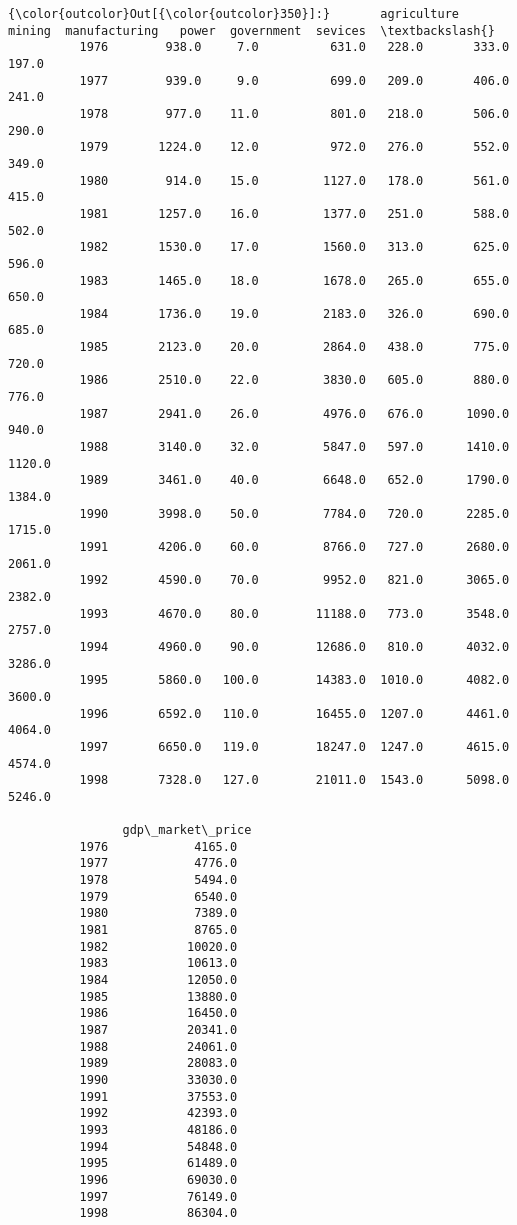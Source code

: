 \documentclass[11pt]{article}
\begin{document}
\begin{Verbatim}[commandchars=\\\{\}]
{\color{outcolor}Out[{\color{outcolor}350}]:}       agriculture  mining  manufacturing   power  government  sevices  \textbackslash{}
          1976        938.0     7.0          631.0   228.0       333.0    197.0   
          1977        939.0     9.0          699.0   209.0       406.0    241.0   
          1978        977.0    11.0          801.0   218.0       506.0    290.0   
          1979       1224.0    12.0          972.0   276.0       552.0    349.0   
          1980        914.0    15.0         1127.0   178.0       561.0    415.0   
          1981       1257.0    16.0         1377.0   251.0       588.0    502.0   
          1982       1530.0    17.0         1560.0   313.0       625.0    596.0   
          1983       1465.0    18.0         1678.0   265.0       655.0    650.0   
          1984       1736.0    19.0         2183.0   326.0       690.0    685.0   
          1985       2123.0    20.0         2864.0   438.0       775.0    720.0   
          1986       2510.0    22.0         3830.0   605.0       880.0    776.0   
          1987       2941.0    26.0         4976.0   676.0      1090.0    940.0   
          1988       3140.0    32.0         5847.0   597.0      1410.0   1120.0   
          1989       3461.0    40.0         6648.0   652.0      1790.0   1384.0   
          1990       3998.0    50.0         7784.0   720.0      2285.0   1715.0   
          1991       4206.0    60.0         8766.0   727.0      2680.0   2061.0   
          1992       4590.0    70.0         9952.0   821.0      3065.0   2382.0   
          1993       4670.0    80.0        11188.0   773.0      3548.0   2757.0   
          1994       4960.0    90.0        12686.0   810.0      4032.0   3286.0   
          1995       5860.0   100.0        14383.0  1010.0      4082.0   3600.0   
          1996       6592.0   110.0        16455.0  1207.0      4461.0   4064.0   
          1997       6650.0   119.0        18247.0  1247.0      4615.0   4574.0   
          1998       7328.0   127.0        21011.0  1543.0      5098.0   5246.0   
          
                gdp\_market\_price  
          1976            4165.0  
          1977            4776.0  
          1978            5494.0  
          1979            6540.0  
          1980            7389.0  
          1981            8765.0  
          1982           10020.0  
          1983           10613.0  
          1984           12050.0  
          1985           13880.0  
          1986           16450.0  
          1987           20341.0  
          1988           24061.0  
          1989           28083.0  
          1990           33030.0  
          1991           37553.0  
          1992           42393.0  
          1993           48186.0  
          1994           54848.0  
          1995           61489.0  
          1996           69030.0  
          1997           76149.0  
          1998           86304.0  
\end{Verbatim}
            
\end{document}
